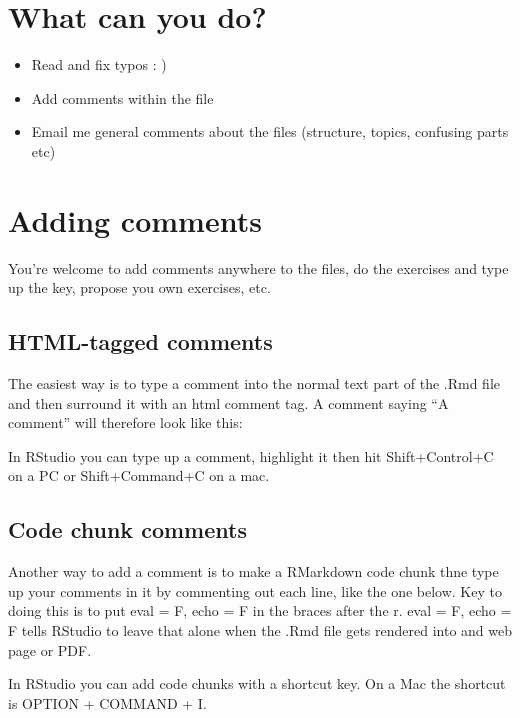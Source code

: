 \documentclass[
]{book}
\providecommand{\tightlist}{%
  \setlength{\itemsep}{0pt}\setlength{\parskip}{0pt}}
\begin{document}
\hypertarget{what-can-you-do}{%
\section{What can you do?}\label{what-can-you-do}}

\begin{itemize}
\tightlist
\item
  Read and fix typos : )
\item
  Add comments within the file
\item
  Email me general comments about the files (structure, topics, confusing parts etc)
\end{itemize}

\hypertarget{adding-comments}{%
\section{Adding comments}\label{adding-comments}}

You're welcome to add comments anywhere to the files, do the exercises and type up the key, propose you own exercises, etc.

\hypertarget{html-tagged-comments}{%
\subsection{HTML-tagged comments}\label{html-tagged-comments}}

The easiest way is to type a comment into the normal text part of the .Rmd file and then surround it with an html comment tag. A comment saying ``A comment'' will therefore look like this:

In RStudio you can type up a comment, highlight it then hit Shift+Control+C on a PC or Shift+Command+C on a mac.

\hypertarget{code-chunk-comments}{%
\subsection{Code chunk comments}\label{code-chunk-comments}}

Another way to add a comment is to make a RMarkdown code chunk thne type up your comments in it by commenting out each line, like the one below. Key to doing this is to put eval = F, echo = F in the braces after the r. eval = F, echo = F tells RStudio to leave that alone when the .Rmd file gets rendered into and web page or PDF.

In RStudio you can add code chunks with a shortcut key. On a Mac the shortcut is OPTION + COMMAND + I.
\end{document}
